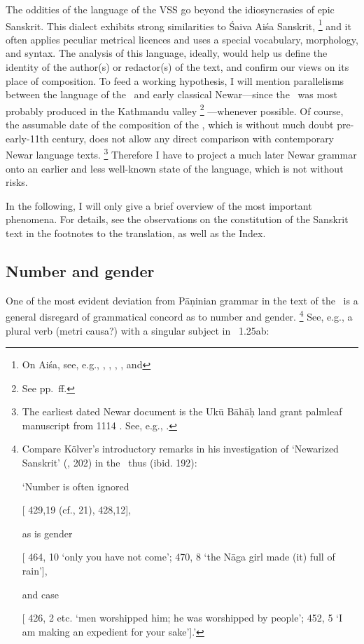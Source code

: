 The oddities of the language of the VSS go beyond the idiosyncrasies of epic Sanskrit.
This dialect exhibits strong similarities to Śaiva Aiśa Sanskrit,%
		\footnote{On Aiśa, see, e.g., , 
								  ,
						          , 
						          , and
						          } 
and it often applies peculiar metrical licences and
uses a special vocabulary, morphology, and syntax.
The analysis of this language, ideally, would help us
define the identity of the author(s) or redactor(s) of the text,
and confirm our views on its place of composition.
To feed a working hypothesis, I will mention parallelisms
between the language of the \VSS\ and early classical 
Newar---since the \VSS\ was most probably produced in the 
Kathmandu valley%
		\footnote{See pp.~\pageref{provenance}\thinspace ff.}%
---whenever possible. 
Of course, the assumable date
of the composition of the \VSS, which is without much doubt
pre-early-11th century, does not allow any direct
comparison with contemporary Newar language texts.%
	\footnote{The earliest dated Newar document is 
			the Ukū Bāhāḥ land grant palmleaf manuscript from
			1114 \CE. See, e.g., .}
Therefore I have to project a much later Newar grammar
onto an earlier and less well-known 
state of the language, which is not without risks.

In the following, I will only give a brief overview of the most
important phenomena. For details, see the observations 
on the constitution of the Sanskrit text in the footnotes 
to the translation, as well as the Index.


\subsection{Number and gender}\label{number}
One of the most evident deviation from Pāṇinian grammar in 
the text of the \VSS\ is a general disregard of grammatical concord 
as to number and gender.%
	\footnote{Compare Kölver's introductory remarks in his investigation of
	`Newarized Sanskrit' (\citeyear{KolverErgative}, 202) in the \SvayP\ thus (ibid. 192):
					
					\noindent
	          	`Number is often ignored
	          	
					[ 429,19 (cf., 21), 
					 428,12],
					
					\noindent
					as is gender
					
			[ 464, 10 `only you have not come’; 
			 470, 8 
					`the Nāga girl made (it) full of rain'],
				
				\noindent
				and case
				
				[ 426, 2 etc. 
				`men worshipped him; he was worshipped by people'; 
				 452, 5 
				`I am making an expedient for your sake'].'}
See, e.g., a plural verb
(metri causa?) with a singular subject in \VSS\ 1.25ab:

